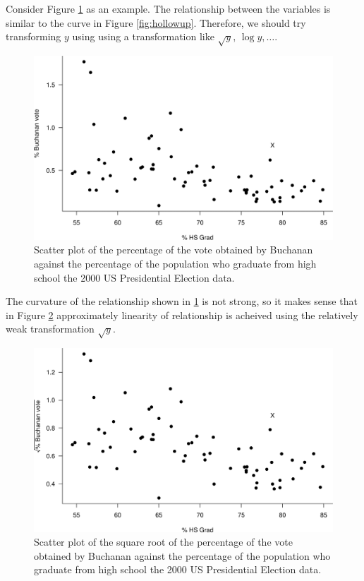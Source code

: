\documentclass[
  11pt,
  british,
  openany, a4paper]{book}
\begin{document}
Consider Figure \ref{fig:electionHS1} as an example. The relationship between the variables is similar to the curve in Figure \ref{fig:hollowup}. Therefore, we should try transforming \(y\) using using a transformation like \(\sqrt{y}, \, \log y, \ldots\).

\begin{figure}

{\centering \includegraphics[width=0.75\linewidth]{images/election_HS1} 

}

\caption{Scatter plot of the percentage of the vote obtained by Buchanan against the percentage of the population who graduate from high school the 2000 US Presidential Election data.}\label{fig:electionHS1}
\end{figure}

The curvature of the relationship shown in \ref{fig:electionHS1} is not strong, so it makes sense that in Figure \ref{fig:electionHS2} approximately linearity of relationship is acheived using the relatively weak transformation \(\sqrt{y}\).

\begin{figure}

{\centering \includegraphics[width=0.75\linewidth]{images/election_HS2} 

}

\caption{Scatter plot of the square root of the percentage of the vote obtained by Buchanan against the percentage of the population who graduate from high school the 2000 US Presidential Election data.}\label{fig:electionHS2}
\end{figure}
\end{document}
